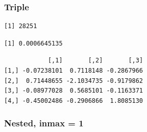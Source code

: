 \documentclass[
  12pt,
  letterpaper,
  DIV=11,
  numbers=noendperiod]{scrartcl}
\newenvironment{Shaded}{\begin{snugshade}}{\end{snugshade}}
\newcommand{\AttributeTok}[1]{\textcolor[rgb]{0.40,0.45,0.13}{#1}}
\newcommand{\ConstantTok}[1]{\textcolor[rgb]{0.56,0.35,0.01}{#1}}
\newcommand{\DecValTok}[1]{\textcolor[rgb]{0.68,0.00,0.00}{#1}}
\newcommand{\FunctionTok}[1]{\textcolor[rgb]{0.28,0.35,0.67}{#1}}
\newcommand{\NormalTok}[1]{\textcolor[rgb]{0.00,0.23,0.31}{#1}}
\newcommand{\OtherTok}[1]{\textcolor[rgb]{0.00,0.23,0.31}{#1}}
\newcommand{\SpecialCharTok}[1]{\textcolor[rgb]{0.37,0.37,0.37}{#1}}
\begin{document}
\subsubsection{Triple}\label{triple}

\begin{Shaded}
\end{Shaded}

\begin{verbatim}
[1] 28251
\end{verbatim}

\begin{Shaded}
\end{Shaded}

\begin{verbatim}
[1] 0.0006645135
\end{verbatim}

\begin{Shaded}
\end{Shaded}

\begin{verbatim}
            [,1]       [,2]       [,3]
[1,] -0.07238101  0.7118148 -0.2867966
[2,]  0.71448655 -2.1034735 -0.9179862
[3,] -0.08977028  0.5685101 -0.1163371
[4,] -0.45002486 -0.2906866  1.8085130
\end{verbatim}

\subsubsection{Nested, inmax = 1}\label{nested-inmax-1}

\begin{Shaded}
\end{Shaded}
\end{document}
